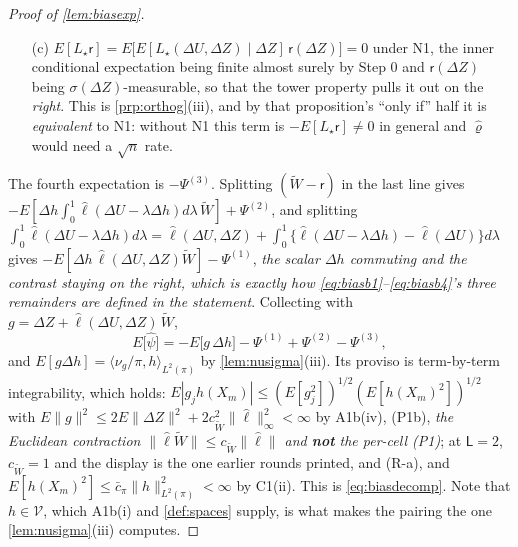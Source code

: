 \begin{proof}[Proof of \cref{lem:biasexp}]
\begin{enumerate}
$\sigma(\Delta U,\Delta Z)$-measurable, and
$E\|D\widetilde W\|<\infty$ by Step 0, so the tower property applies and pulls $D$ out on the left.
\emph{That is the direction \cref{prp:orthog}\textup{(ii)}'s own hypothesis line prints}, which asks for
$E[\|D\|\mid\Delta Z]<\infty$ almost surely and $E\|D\widetilde W\|<\infty$ and for nothing about
$\widetilde WD$. \emph{No rate for $\hat L$ is used and
none is available at this point}; the vanishing is a consequence of $\psi$ being \emph{affine} in $L$, which
is \cref{lem:secondord}(ii)'s first half read as an identity.
\item[(c)] $E[L_\star\mathsf r]=E\big[E[L_\star(\Delta U,\Delta Z)\mid\Delta Z]\,\mathsf r(\Delta Z)\big]=0$
under N1, the inner conditional expectation being finite almost surely by Step 0 and
$\mathsf r(\Delta Z)$ being $\sigma(\Delta Z)$-measurable, so that the tower property pulls it out on the
\emph{right}. This is
\cref{prp:orthog}(iii), and by that proposition's ``only if'' half it is \emph{equivalent} to N1: without N1
this term is $-E[L_\star\mathsf r]\ne0$ in general and $\hat\varrho$ would need a $\sqrt n$ rate.
\end{enumerate}
The fourth expectation is $-\Psi^{(3)}$. Splitting $(\widetilde W-\mathsf r)$ in the last line gives
$-E[\Delta h\int_0^1\hat\ell(\Delta U-\lambda\Delta h)d\lambda\,\widetilde W]+\Psi^{(2)}$, and splitting
$\int_0^1\hat\ell(\Delta U-\lambda\Delta h)d\lambda=\hat\ell(\Delta U,\Delta Z)+\int_0^1\{\hat\ell(\Delta U-\lambda\Delta h)-\hat\ell(\Delta U)\}d\lambda$
gives $-E[\Delta h\,\hat\ell(\Delta U,\Delta Z)\widetilde W]-\Psi^{(1)}$, \emph{the scalar $\Delta h$
commuting and the contrast staying on the right, which is exactly how
\eqref{eq:biasb1}--\eqref{eq:biasb4}'s three remainders are defined in the statement}. Collecting with
$g=\Delta Z+\hat\ell(\Delta U,\Delta Z)\,\widetilde W$,
\[
E\big[\hat\psi\big]=-E\big[g\,\Delta h\big]-\Psi^{(1)}+\Psi^{(2)}-\Psi^{(3)} ,
\]
and $E[g\Delta h]=\langle\nu_g/\pi,h\rangle_{L^{2}(\pi)}$ by \cref{lem:nusigma}(iii). Its proviso is
term-by-term integrability, which holds: $E|g_jh(X_m)|\le(E[g_j^{2}])^{1/2}(E[h(X_m)^{2}])^{1/2}$ with
$E\|g\|^{2}\le2E\|\Delta Z\|^{2}+2c_{\widetilde W}^{2}\|\hat\ell\|^{2}_\infty<\infty$ by A1b(iv),
\textup{(P1b)}, \emph{the Euclidean contraction $\|\hat\ell\widetilde W\|\le c_{\widetilde W}\|\hat\ell\|$
and \textbf{not} the per-cell \textup{(P1)}}; at $\mathsf L=2$, $c_{\widetilde W}=1$ and the display is the
one earlier rounds printed, and (R-a), and
$E[h(X_m)^{2}]\le\bar c_\pi\|h\|^{2}_{L^{2}(\pi)}<\infty$ by C1(ii). This is \eqref{eq:biasdecomp}. Note that
$h\in\mathcal V$, which A1b(i) and \cref{def:spaces} supply, is what makes the pairing the one
\cref{lem:nusigma}(iii) computes.


\end{proof}
